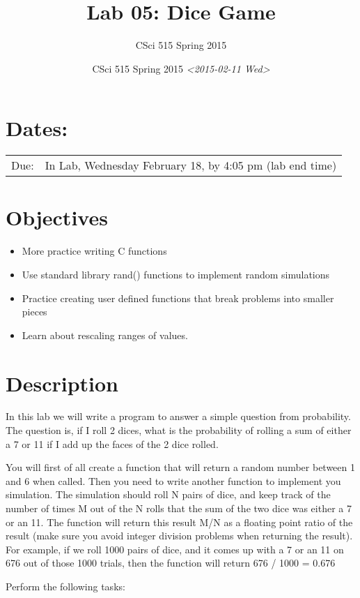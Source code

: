 \documentclass[11pt]{article}
\author{CSci 515 Spring 2015}
\date{CSci 515 Spring 2015 \textit{<2015-02-11 Wed>}}
\title{Lab 05: Dice Game}
\begin{document}
\maketitle

\section*{Dates:}
\label{sec-1}
\begin{center}
\begin{tabular}{ll}
Due: & In Lab, Wednesday February 18, by 4:05 pm (lab end time)\\
\end{tabular}
\end{center}
\section*{Objectives}
\label{sec-2}
\begin{itemize}
\item More practice writing C functions
\item Use standard library rand() functions to implement random simulations
\item Practice creating user defined functions that break problems into smaller pieces
\item Learn about rescaling ranges of values.
\end{itemize}
\section*{Description}
\label{sec-3}
In this lab we will write a program to answer a simple question from
probability.  The question is, if I roll 2 dices, what is the probability
of rolling a sum of either a 7 or 11 if I add up the faces of the 2 dice
rolled.

You will first of all create a function that will return a random
number between 1 and 6 when called.  Then you need to write another
function to implement you simulation.  The simulation should roll N
pairs of dice, and keep track of the number of times M out of the N
rolls that the sum of the two dice was either a 7 or an 11.  The
function will return this result M/N as a floating point ratio of the
result (make sure you avoid integer division problems when returning
the result).  For example, if we roll 1000 pairs of dice, and it comes
up with a 7 or an 11 on 676 out of those 1000 trials, then the
function will return 676 / 1000 = 0.676


Perform the following tasks:
\end{document}

